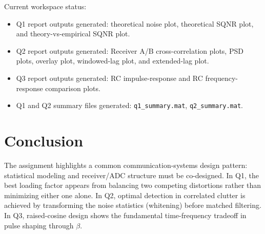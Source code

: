 \documentclass{article}
\begin{document}
Current workspace status:
\begin{itemize}
\item[$\rightarrow$] Q1 report outputs generated: theoretical noise plot, theoretical SQNR plot, and theory-vs-empirical SQNR plot.
\item[$\rightarrow$] Q2 report outputs generated: Receiver A/B cross-correlation plots, PSD plots, overlay plot, windowed-lag plot, and extended-lag plot.
\item[$\rightarrow$] Q3 report outputs generated: RC impulse-response and RC frequency-response comparison plots.
\item[$\rightarrow$] Q1 and Q2 summary files generated: \texttt{q1\_summary.mat}, \texttt{q2\_summary.mat}.
\end{itemize}

\section*{Conclusion}
The assignment highlights a common communication-systems design pattern: statistical modeling and receiver/ADC structure must be co-designed. In Q1, the best loading factor appears from balancing two competing distortions rather than minimizing either one alone. In Q2, optimal detection in correlated clutter is achieved by transforming the noise statistics (whitening) before matched filtering. In Q3, raised-cosine design shows the fundamental time-frequency tradeoff in pulse shaping through $\beta$.
\end{document}
